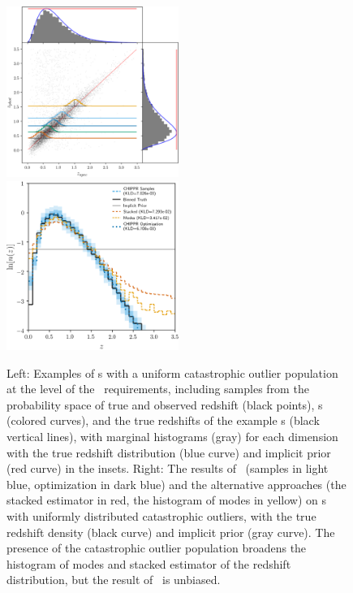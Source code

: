 \begin{figure}
	\includegraphics[width=0.5\textwidth]{figures/chippr/single_uout_mega_scatter.png}
	\includegraphics[width=0.5\textwidth]{figures/chippr/single_uout_log_estimators.png}
	\caption{
		Left: Examples of \pzpdf s with a uniform catastrophic outlier population at the level of the \lsst\ requirements, including samples from the probability space of true and observed redshift (black points), \pzpdf s (colored curves), and the true redshifts of the example \pzpdf s (black vertical lines), with marginal histograms (gray) for each dimension with the true redshift distribution (blue curve) and implicit prior (red curve) in the insets.
		Right: The results of \Chippr\ (samples in light blue, optimization in dark blue) and the alternative approaches (the stacked estimator in red, the histogram of modes in yellow) on \pzpdf s with uniformly distributed catastrophic outliers, with the true redshift density (black curve) and implicit prior (gray curve).
		The presence of the catastrophic outlier population broadens the histogram of modes and stacked estimator of the redshift distribution, but the result of \Chippr\ is unbiased.
	}
\end{figure}

